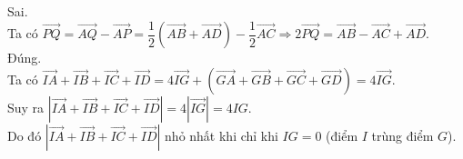\begin{ex}
{\begin{itemchoice}
			\itemch Sai.\\ %
			Ta có $\vec{PQ}=\vec{AQ}-\vec{AP}=\dfrac12\left(\vec{AB}+\vec{AD}\right)-\dfrac12\vec{AC}\Rightarrow 2\vec{PQ}=\vec{AB}-\vec{AC}+\vec{AD}$.
			\itemch Đúng.\\ %
			Ta có $\vec{IA}+\vec{IB}+\vec{IC}+\vec{ID}=4\vec{IG}+\left(\vec{GA}+\vec{GB}+\vec{GC}+\vec{GD}\right)=4\vec{IG}$.\\
			Suy ra $|\vec{IA}+\vec{IB}+\vec{IC}+\vec{ID}|=4|\vec{IG}|=4IG$.\\
			Do đó $|\vec{IA}+\vec{IB}+\vec{IC}+\vec{ID}|$ nhỏ nhất khi chỉ khi $IG=0$ (điểm $I$ trùng điểm $G$).
		\end{itemchoice}
	}
\end{ex}

